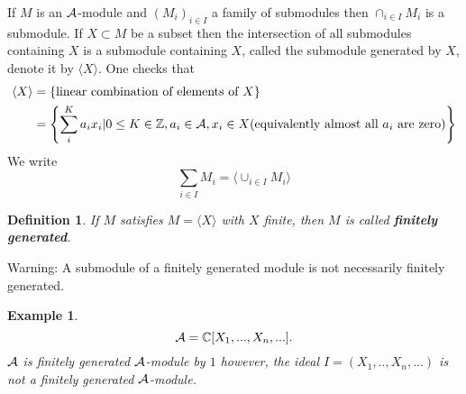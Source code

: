\documentclass[11pt]{article}
\newtheorem{dfn}[thm]{Definition}
\newtheorem{ex}[thm]{Example}
\newcommand{\cplx}{\mathbb C}
\newcommand{\intg}{\mathbb Z}
\newcommand{\cala}{{\cal A}}
\newcommand{\lgl}{\langle}
\newcommand{\rgl}{\rangle}
\begin{document}
If $M$ is an $\cala$-module and $(M_i)_{i\in I} $ a family of submodules then $\cap_{i\in I} M_i$ is a submodule.
If $X\subset M$ be a  subset then the intersection of all submodules  containing $X$ is a submodule containing $X$, called the  submodule generated by $X$, denote it by $\lgl X\rgl$.
One checks that 
$$
\begin{aligned}
\lgl X\rgl&=\left\{\text{linear combination of elements of } X\right\}\\
&=\left\{\sum^K_i a_i x_i|0\leq K\in \intg, a_i\in\cala, x_i\in X(\text{equivalently almost all $a_i$ are zero})\right\}
\end{aligned}
$$
We write 
$$
\sum_{i\in I} M_i=\lgl \cup_{i\in I} M_i\rgl
$$
\begin{dfn}
If $M$ satisfies $M=\lgl X\rgl$ with $X$ finite, then $M$ is called \textbf{finitely generated}.
\end{dfn}
Warning: A submodule of a finitely generated module is not necessarily finitely generated.
\begin{ex}
$$
\cala=\cplx[X_1,...,X_n,...].
$$
$\cala$ is finitely generated $\cala$-module by $1$ however, the ideal 
$
I=(X_1,..,X_n,...)$ is not a finitely generated $\cala$-module.
\end{ex}
\end{document}
